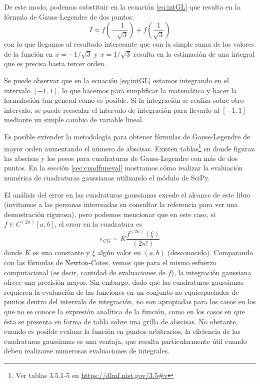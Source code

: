 De este modo, podemos substituir en la ecuación \eqref{eq:intGL} que resulta en la fórmula de Gauss-Legendre de dos puntos:
\begin{equation}\label{eq:intGL2}
 I \approx f\left( -\frac{1}{\sqrt{3}} \right) + f\left( \frac{1}{\sqrt{3}} \right)
\end{equation} 
con lo que llegamos al resultado interesante que con la simple suma de los valores de la función en $x = -1/\sqrt{3}$ y $x = 1/\sqrt{3}$ resulta en la estimación de una integral que es precisa hasta tercer orden.

Se puede observar que en la ecuación \eqref{eq:intGL} estamos integrando en el intervalo $[-1, 1]$, lo que hacemos para simplificar la matemática y hacer la formulación tan general como es posible. Si la integración se realiza sobre otro intervalo, se puede reescalar el intervalo de integración para llevarlo al $[-1, 1]$ mediante un simple cambio de variable lineal.

Es posible extender la metodología para obtener fórmulas de Gauss-Legendre de mayor orden aumentando el número de abscisas. Existen tablas\footnote{Ver tablas 3.5.1-5 en \url{https://dlmf.nist.gov/3.5\#v}} en donde figuran las abscisas y los pesos para cuadraturas de Gauss-Legendre con más de dos puntos. En la sección \ref{sec:cuadfuneval} mostramos cómo realizar la evaluación numérica de cuadraturas gaussianas utilizando el módulo  de SciPy. 

El análisis del error en las cuadraturas gaussianas excede el alcance de este libro (invitamos a las personas interesadas en consultar la referencia \citep{stoer2002} para ver una demostración rigurosa), pero podemos mencionar que en este caso, si $f \in C^{(2n)} [a, b]$, el error en la cuadratura es
\begin{equation}
    \varepsilon_{CG} = K \frac{f^{(2n)}(\xi)}{(2n!)}
\end{equation} 
donde $K$ es una constante y $\xi$ algún valor en $(a, b)$ (desconocido). Comparando con las fórmulas de Newton-Cotes, vemos que para el mismo esfuerzo computacional (es decir, cantidad de evaluaciones de $f$), la integración gaussiana ofrece una precisión mayor. Sin embargo, dado que las cuadraturas gaussianas requieren la evaluación de las funciones en un conjunto no equiespaciados de puntos dentro del intervalo de integración, no son apropiadas para los casos en los que no se conoce la expresión analítica de la función, como en los casos en que ésta se presenta en forma de tabla sobre una grilla de abscisas. No obstante, cuando es posible evaluar la función en puntos arbitrarios, la eficiencia de las cuadraturas gaussianas es una ventaja, que resulta particularmente útil cuando deben realizarse numerosas evaluaciones de integrales.




